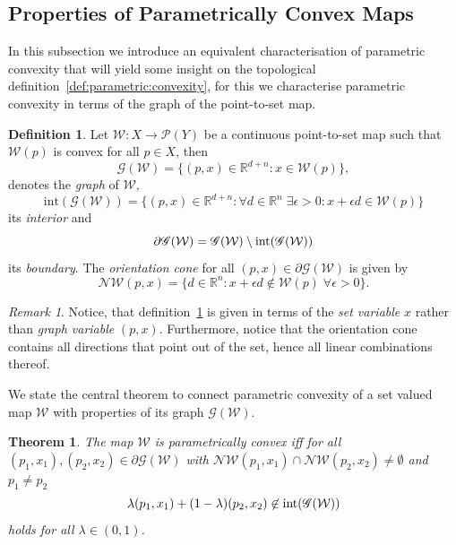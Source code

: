 \documentclass[journal]{IEEEtran}
\newcounter{thmcount}
\newtheorem{thm}[thmcount]{Theorem}
\theoremstyle{remark}
\newtheorem{rem}[thmcount]{Remark}
\theoremstyle{definition}
\newtheorem{defi}[thmcount]{Definition}
\begin{document}
\subsection{Properties of Parametrically Convex Maps}
%
In this subsection we introduce an equivalent characterisation of parametric 
convexity that will yield some insight on the topological 
definition~\ref{def:parametric:convexity}, for this we characterise parametric
convexity in terms of the graph of the point-to-set map.
%
\begin{defi}\label{def:graph:of:map}
Let $\mathcal W:X\rightarrow \mathscr P(Y)$ be a continuous point-to-set map
such that $\mathcal W(p)$ is convex for all $p\in X$, then 
%
\[
  \mathscr G(\mathcal W) = \{(p,x) \in\mathbb R^{d+n}: x\in\mathcal W(p)\},
\]
%
denotes the \emph{graph} of $\mathcal W$,
%
\[
  \text{int}(\mathscr G(\mathcal W)) = \{(p,x) \in\mathbb R^{d+n}: \forall d\in\mathbb R^n\;\exists 
  \epsilon>0 : x+\epsilon d\in \mathcal W(p)\}
\]
%
its \emph{interior} and
%
\[
  \partial \mathscr G(\mathcal W) = \mathscr G(\mathcal W)\setminus \textup{int}(\mathscr G(\mathcal W))
\]
%
its \emph{boundary}. 
%
The \emph{orientation cone} for all $(p,x)\in\partial\mathscr G(\mathcal W)$
is given by
%
\[
  \mathcal N\mathcal W(p,x) = \{d\in\mathbb R^n: x+\epsilon d \not\in \mathcal W(p)\; \forall \epsilon>0\}.
\]
\end{defi}
%
\begin{rem}
%
Notice, that definition~\ref{def:graph:of:map} is given in terms of the \emph{set variable} $x$ rather than \emph{graph variable} $(p,x)$.
%
Furthermore, notice that the orientation cone contains all directions that 
point out of the set, hence all linear combinations thereof.
%
\end{rem}
%
We state the central theorem to connect parametric convexity of a set valued 
map $\mathcal W$ with properties of its graph $\mathscr G(\mathcal W)$.
%
\begin{thm}\label{thm:p:convexity:graph}
The map $\mathcal W$ is parametrically convex iff for all $(p_1,x_1),(p_2,x_2)\in\partial\mathscr G(\mathcal W)$
with $\mathcal N\mathcal W(p_1,x_1)\cap\mathcal N\mathcal W(p_2,x_2)\neq\emptyset$ and $p_1\neq p_2$ 
%
\begin{equation}\label{eq:graph:def:p:convexity}
\lambda (p_1,x_1) + (1-\lambda) (p_2,x_2) \not\in\textup{int} (\mathscr G(\mathcal W))
\end{equation}
%
holds for all $\lambda\in(0,1)$.
%
\end{thm}
%
\end{document}
